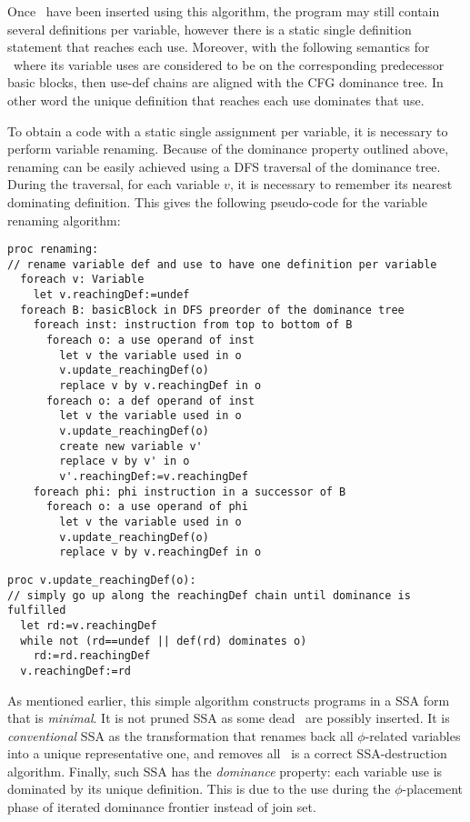 Once \phiops\ have been inserted using this algorithm, the program may still contain several definitions per variable, however there is a static single definition statement that reaches each use. Moreover, with the following semantics for \phiops\ where its variable uses are considered to be on the corresponding predecessor basic blocks, then use-def chains are aligned with the CFG dominance tree. In other word the unique definition that reaches each use dominates that use.

To obtain a code with a static single assignment per variable, it is necessary to perform variable renaming. Because of the dominance property outlined above,
renaming can be easily achieved using a DFS traversal of the dominance tree.
During the traversal, for each variable $v$, it is necessary to remember its nearest dominating definition.
This gives the following pseudo-code for the variable renaming algorithm:
\begin{verbatim}
proc renaming:
// rename variable def and use to have one definition per variable
  foreach v: Variable
    let v.reachingDef:=undef
  foreach B: basicBlock in DFS preorder of the dominance tree
    foreach inst: instruction from top to bottom of B
      foreach o: a use operand of inst
        let v the variable used in o
        v.update_reachingDef(o)
        replace v by v.reachingDef in o
      foreach o: a def operand of inst
        let v the variable used in o
        v.update_reachingDef(o)
        create new variable v'
        replace v by v' in o
        v'.reachingDef:=v.reachingDef
    foreach phi: phi instruction in a successor of B
      foreach o: a use operand of phi
        let v the variable used in o
        v.update_reachingDef(o)
        replace v by v.reachingDef in o
\end{verbatim}

\begin{verbatim}
proc v.update_reachingDef(o):
// simply go up along the reachingDef chain until dominance is fulfilled 
  let rd:=v.reachingDef
  while not (rd==undef || def(rd) dominates o)
    rd:=rd.reachingDef
  v.reachingDef:=rd
\end{verbatim}

As mentioned earlier, this simple algorithm constructs programs in a SSA form that is \textit{minimal}. It is not pruned SSA as some dead \phiops\ are possibly inserted. 
It is \textit{conventional} SSA as the transformation that renames back all $\phi$-related variables into a unique representative one, and removes all \phiops\ is a correct SSA-destruction algorithm.
Finally, such SSA has the \textit{dominance} property: each variable use is dominated by its unique definition. This is due to the use during the $\phi$-placement phase of iterated dominance frontier instead of join set.

